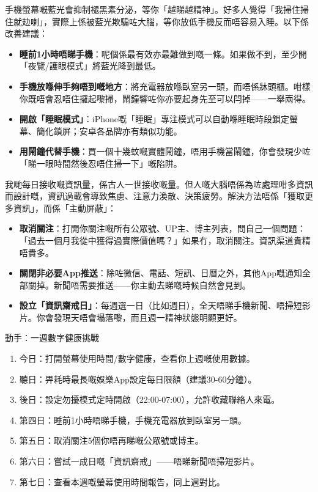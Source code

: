 
手機螢幕嘅藍光會抑制褪黑素分泌，等你「越睇越精神」。好多人覺得「我掃住掃住就攰喇」，實際上係被藍光欺騙咗大腦，等你放低手機反而唔容易入睡。以下係改善建議：

\begin{itemize}
  \item \textbf{睡前1小時唔睇手機}：呢個係最有效亦最難做到嘅一條。如果做不到，至少開「夜覽/護眼模式」將藍光降到最低。
  \item \textbf{手機放喺伸手夠唔到嘅地方}：將充電器放喺臥室另一頭，而唔係牀頭櫃。咁樣你既唔會忍唔住攞起嚟掃，鬧鐘響咗你亦要起身先至可以閂掉——一舉兩得。
  \item \textbf{開啟「睡眠模式」}：iPhone嘅「睡眠」專注模式可以自動喺睡眠時段鎖定螢幕、簡化鎖屏；安卓各品牌亦有類似功能。
  \item \textbf{用鬧鐘代替手機}：買一個十幾蚊嘅實體鬧鐘，唔用手機當鬧鐘，你會發現少咗「睇一眼時間然後忍唔住掃一下」嘅陷阱。
\end{itemize}


我哋每日接收嘅資訊量，係古人一世接收嘅量。但人嘅大腦唔係為咗處理咁多資訊而設計嘅，資訊過載會導致焦慮、注意力渙散、決策疲勞。解決方法唔係「獲取更多資訊」，而係「主動屏蔽」：

\begin{itemize}
  \item \textbf{取消關注}：打開你關注嘅所有公眾號、UP主、博主列表，問自己一個問題：「過去一個月我從中獲得過實際價值嗎？」如果冇，取消關注。資訊渠道貴精唔貴多。
  \item \textbf{關閉非必要App推送}：除咗微信、電話、短訊、日曆之外，其他App嘅通知全部關掉。新聞唔需要推送——你主動去睇嘅時候自然會見到。
  \item \textbf{設立「資訊齋戒日」}：每週選一日（比如週日），全天唔睇手機新聞、唔掃短影片。你會發現天唔會塌落嚟，而且週一精神狀態明顯更好。
\end{itemize}

\begin{tcbpractice}{動手：一週數字健康挑戰}
\begin{enumerate}
  \item 今日：打開螢幕使用時間/數字健康，查看你上週嘅使用數據。
  \item 聽日：畀耗時最長嘅娛樂App設定每日限額（建議30-60分鐘）。
  \item 後日：設定勿擾模式定時開啟（22:00-07:00），允許收藏聯絡人來電。
  \item 第四日：睡前1小時唔睇手機，手機充電器放到臥室另一頭。
  \item 第五日：取消關注5個你唔再睇嘅公眾號或博主。
  \item 第六日：嘗試一成日嘅「資訊齋戒」——唔睇新聞唔掃短影片。
  \item 第七日：查看本週嘅螢幕使用時間報告，同上週對比。
\end{enumerate}

\end{tcbpractice}


